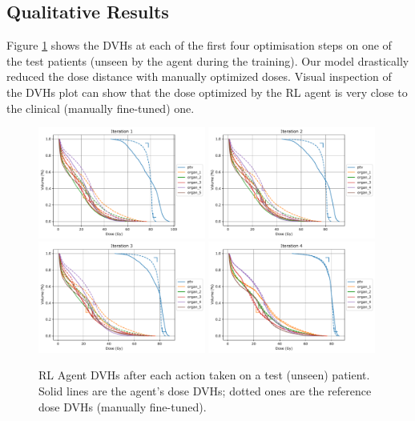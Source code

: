 \subsection{Qualitative Results}
Figure \ref{fig:steps} shows the DVHs at each of the first four optimisation steps on one of the test patients (unseen by the agent during the training).
Our model drastically reduced the dose distance with manually optimized doses.
Visual inspection of the DVHs plot can show that the dose optimized by the RL agent is very close to the clinical (manually fine-tuned) one.

\begin{figure}
	\centering
	\includegraphics[width=0.49\textwidth]{steps/distance-test-w1.pdf}	\includegraphics[width=0.49\textwidth]{steps/distance-test-w2.pdf}	\includegraphics[width=0.49\textwidth]{steps/distance-test-w3.pdf}	\includegraphics[width=0.49\textwidth]{steps/distance-test-w4.pdf}
	\caption{RL Agent DVHs after each action taken on a test (unseen) patient. Solid lines are the agent's dose DVHs; dotted ones are the reference dose DVHs (manually fine-tuned).}
	\label{fig:steps}
\end{figure}

